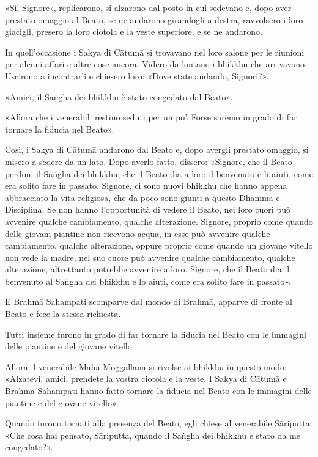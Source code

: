 «Sì, Signore», replicarono, si alzarono dal posto in cui sedevano e,
dopo aver prestato omaggio al Beato, se ne andarono girandogli a destra,
ravvolsero i loro giacigli, presero la loro ciotola e la veste
superiore, e se ne andarono.


In quell’occasione i Sakya di Cātumā si trovavano nel loro salone per le
riunioni per alcuni affari e altre cose ancora. Videro da lontano i
bhikkhu che arrivavano. Uscirono a incontrarli e chiesero loro: «Dove
state andando, Signori?».


«Amici, il Saṅgha dei bhikkhu è stato congedato dal Beato».


«Allora che i venerabili restino seduti per un po’. Forse saremo in
grado di far tornare la fiducia nel Beato».


Così, i Sakya di Cātumā andarono dal Beato e, dopo avergli prestato
omaggio, si misero a sedere da un lato. Dopo averlo fatto, dissero:
«Signore, che il Beato perdoni il Saṅgha dei bhikkhu, che il Beato dia a
loro il benvenuto e li aiuti, come era solito fare in passato. Signore,
ci sono nuovi bhikkhu che hanno appena abbracciato la vita religiosa,
che da poco sono giunti a questo Dhamma e Disciplina. Se non hanno
l’opportunità di vedere il Beato, nei loro cuori può avvenire qualche
cambiamento, qualche alterazione. Signore, proprio come quando delle
giovani piantine non ricevono acqua, in esse può avvenire qualche
cambiamento, qualche alterazione, oppure proprio come quando un giovane
vitello non vede la madre, nel suo cuore può avvenire qualche
cambiamento, qualche alterazione, altrettanto potrebbe avvenire a loro.
Signore, che il Beato dia il benvenuto al Saṅgha dei bhikkhu e lo aiuti,
come era solito fare in passato».


E Brahmā Sahampati scomparve dal mondo di Brahmā, apparve di fronte al
Beato e fece la stessa richiesta.


Tutti insieme furono in grado di far tornare la fiducia nel Beato con le
immagini delle piantine e del giovane vitello.


Allora il venerabile Mahā-Moggallāna si rivolse ai bhikkhu in questo
modo: «Alzatevi, amici, prendete la vostra ciotola e la veste. I Sakya
di Cātumā e Brahmā Sahampati hanno fatto tornare la fiducia nel Beato
con le immagini delle piantine e del giovane vitello».


Quando furono tornati alla presenza del Beato, egli chiese al venerabile
Sāriputta: «Che cosa hai pensato, Sāriputta, quando il Saṅgha dei
bhikkhu è stato da me congedato?».


